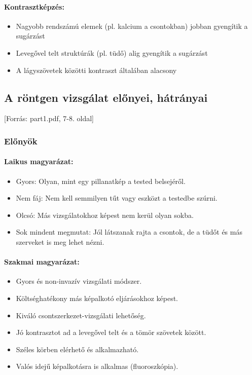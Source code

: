 \documentclass[a4paper,12pt]{article}
\begin{document}
\paragraph{Kontrasztképzés:} \begin{itemize} \item Nagyobb rendszámú elemek (pl. kalcium a csontokban) jobban gyengítik a sugárzást \item Levegővel telt struktúrák (pl. tüdő) alig gyengítik a sugárzást \item A lágyszövetek közötti kontraszt általában alacsony \end{itemize}

\subsection{A röntgen vizsgálat előnyei, hátrányai} [Forrás: part1.pdf, 7-8. oldal]

\subsubsection{Előnyök}

\paragraph{Laikus magyarázat:} \begin{itemize} \item Gyors: Olyan, mint egy pillanatkép a tested belsejéről. \item Nem fáj: Nem kell semmilyen tűt vagy eszközt a testedbe szúrni. \item Olcsó: Más vizsgálatokhoz képest nem kerül olyan sokba. \item Sok mindent megmutat: Jól látszanak rajta a csontok, de a tüdőt és más szerveket is meg lehet nézni. \end{itemize}

\paragraph{Szakmai magyarázat:} \begin{itemize} \item Gyors és non-invazív vizsgálati módszer. \item Költséghatékony más képalkotó eljárásokhoz képest. \item Kiváló csontszerkezet-vizsgálati lehetőség. \item Jó kontrasztot ad a levegővel telt és a tömör szövetek között. \item Széles körben elérhető és alkalmazható. \item Valós idejű képalkotásra is alkalmas (fluoroszkópia). \end{itemize}
\end{document}
